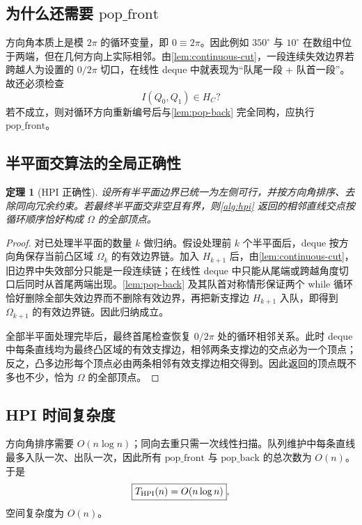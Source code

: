 \documentclass[UTF8,12pt,a4paper]{ctexart}
\newtheorem{theorem}{定理}[section]
\theoremstyle{definition}
\begin{document}
\subsection{为什么还需要 \texorpdfstring{$\mathrm{pop\_front}$}{pop-front}}

方向角本质上是模 $2\pi$ 的循环变量，即 $0\equiv2\pi$。因此例如 $350^\circ$ 与 $10^\circ$ 在数组中位于两端，但在几何方向上实际相邻。由\cref{lem:continuous-cut}，一段连续失效边界若跨越人为设置的 $0/2\pi$ 切口，在线性 deque 中就表现为“队尾一段 + 队首一段”。故还必须检查
\[
I(Q_0,Q_1)\in H_C?
\]
若不成立，则对循环方向重新编号后与\cref{lem:pop-back} 完全同构，应执行 $\mathrm{pop\_front}$。

\subsection{半平面交算法的全局正确性}

\begin{theorem}[HPI 正确性]
设所有半平面边界已统一为左侧可行，并按方向角排序、去除同向冗余约束。若最终半平面交非空且有界，则\cref{alg:hpi} 返回的相邻直线交点按循环顺序恰好构成 $\Omega$ 的全部顶点。
\label{thm:hpi-correct}
\end{theorem}
\begin{proof}
对已处理半平面的数量 $k$ 做归纳。假设处理前 $k$ 个半平面后，deque 按方向角保存当前凸区域 $\Omega_k$ 的有效边界链。加入 $H_{k+1}$ 后，由\cref{lem:continuous-cut}，旧边界中失效部分只能是一段连续链；在线性 deque 中只能从尾端或跨越角度切口后同时从首尾两端出现。\cref{lem:pop-back} 及其队首对称情形保证两个 while 循环恰好删除全部失效边界而不删除有效边界，再把新支撑边 $H_{k+1}$ 入队，即得到 $\Omega_{k+1}$ 的有效边界链。因此归纳成立。

全部半平面处理完毕后，最终首尾检查恢复 $0/2\pi$ 处的循环相邻关系。此时 deque 中每条直线均为最终凸区域的有效支撑边，相邻两条支撑边的交点必为一个顶点；反之，凸多边形每个顶点必由两条相邻有效支撑边相交得到。因此返回的顶点既不多也不少，恰为 $\Omega$ 的全部顶点。
\end{proof}

\subsection{HPI 时间复杂度}

方向角排序需要 $O(n\log n)$；同向去重只需一次线性扫描。队列维护中每条直线最多入队一次、出队一次，因此所有 $\mathrm{pop\_front}$ 与 $\mathrm{pop\_back}$ 的总次数为 $O(n)$。于是
\begin{equation}
\boxed{T_{\rm HPI}(n)=O(n\log n)},
\end{equation}
空间复杂度为 $O(n)$。
\end{document}
